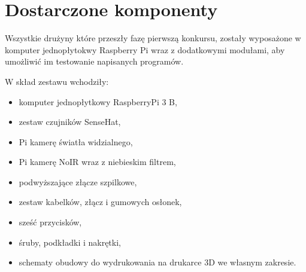 \section{Dostarczone komponenty}\label{sec:cover_introduction}

Wszystkie drużyny które przeszły fazę pierwszą konkursu, zostały wyposażone
w komputer jednopłytokwy Raspberry Pi wraz z dodatkowymi modułami, aby umożliwić im
testowanie napisanych programów.

W skład zestawu wchodziły:
\begin{itemize}
    \item komputer jednopłytkowy RaspberryPi 3 B,
    \item zestaw czujników SenseHat,
    \item Pi kamerę światła widzialnego,
    \item Pi kamerę NoIR wraz z niebieskim filtrem,
    \item podwyższające złącze szpilkowe,
    \item zestaw kabelków, złącz i gumowych osłonek,
    \item sześć przycisków,
    \item śruby, podkładki i nakrętki,
    \item schematy obudowy do wydrukowania na drukarce 3D we własnym zakresie.
\end{itemize}

